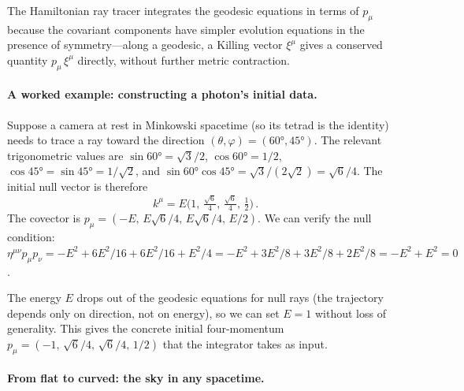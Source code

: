 The Hamiltonian ray tracer integrates the geodesic equations in terms of
$p_\mu$ because the covariant components have simpler evolution equations in
the presence of symmetry---along a geodesic, a Killing vector $\xi^\mu$ gives a
conserved quantity $p_\mu\,\xi^\mu$ directly, without further metric
contraction.

\paragraph{A worked example: constructing a photon's initial data.}

Suppose a camera at rest in Minkowski spacetime (so its tetrad is the identity)
needs to trace a ray toward the direction $(\theta, \varphi) = (60°, 45°)$.
The relevant trigonometric values are $\sin 60° = \sqrt{3}/2$,
$\cos 60° = 1/2$, $\cos 45° = \sin 45° = 1/\sqrt{2}$, and
$\sin 60°\cos 45° = \sqrt{3}/(2\sqrt{2}) = \sqrt{6}/4$.  The initial null
vector is therefore
%
\begin{equation}
  k^\mu = E\bigl(1,\, \tfrac{\sqrt{6}}{4},\,
                     \tfrac{\sqrt{6}}{4},\, \tfrac{1}{2}\bigr) \,.
  \label{eq:photon-example}
\end{equation}
%
The covector is $p_\mu = (-E,\, E\sqrt{6}/4,\,
E\sqrt{6}/4,\, E/2)$.  We can verify the null condition:
$\eta^{\mu\nu} p_\mu p_\nu = -E^2 + 6E^2/16 + 6E^2/16 + E^2/4
= -E^2 + 3E^2/8 + 3E^2/8 + 2E^2/8 = -E^2 + E^2 = 0$.

The energy $E$ drops out of the geodesic equations for null rays (the
trajectory depends only on direction, not on energy), so we can set $E = 1$
without loss of generality.  This gives the concrete initial four-momentum
$p_\mu = (-1,\, \sqrt{6}/4,\, \sqrt{6}/4,\, 1/2)$ that the integrator takes as
input.

\paragraph{From flat to curved: the sky in any spacetime.}

